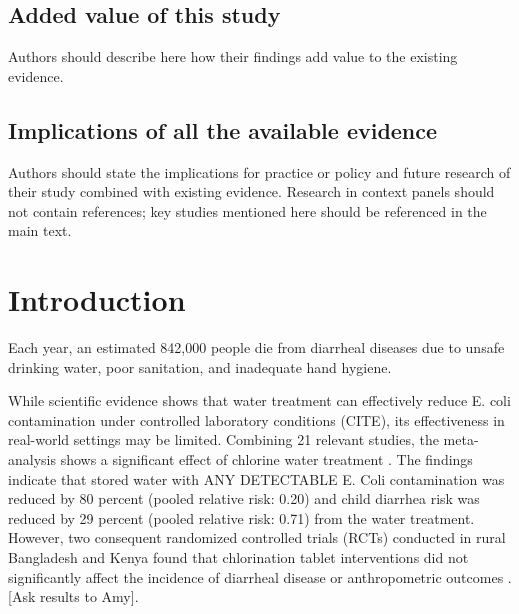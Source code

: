 \documentclass [11pt]{article}
\theoremstyle{plain}
\theoremstyle{definition}
\theoremstyle{remark}
\newcommand{\1}{\bm{1}}
\begin{document}
\subsection{Added value of this study}  
Authors should describe here how their findings add value to the existing evidence.

\subsection{Implications of all the available evidence}  
Authors should state the implications for practice or policy and future research of their study combined with existing evidence. Research in context panels should not contain references; key studies mentioned here should be referenced in the main text.
\fi

\clearpage
\section{Introduction} 
Each year, an estimated 842,000 people die from diarrheal diseases due to unsafe drinking water, poor sanitation, and inadequate hand hygiene. 


While scientific evidence shows that water treatment can effectively reduce E. coli contamination under controlled laboratory conditions (CITE), its effectiveness in real-world settings may be limited. Combining 21 relevant studies, the meta-analysis shows a significant effect of chlorine water treatment \cite{arnold2007treating}. The findings indicate that stored water with ANY DETECTABLE E. Coli contamination was reduced by 80 percent (pooled relative risk: 0.20) and child diarrhea risk was reduced by 29 percent (pooled relative risk: 0.71) from the water treatment. However, two consequent randomized controlled trials (RCTs) conducted in rural Bangladesh and Kenya found that chlorination tablet interventions did not significantly affect the incidence of diarrheal disease or anthropometric outcomes \cite{pickering2019wash, luby2018effects}. [Ask results to Amy]. 
\end{document}

